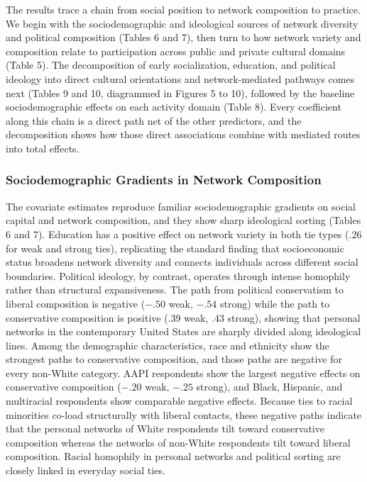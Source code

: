 \documentclass[
  12pt
]{article}
\begin{document}
The results trace a chain from social position to network composition to practice. We begin with the sociodemographic and ideological sources of network diversity and political composition (Tables 6 and 7), then turn to how network variety and composition relate to participation across public and private cultural domains (Table 5). The decomposition of early socialization, education, and political ideology into direct cultural orientations and network-mediated pathways comes next (Tables 9 and 10, diagrammed in Figures 5 to 10), followed by the baseline sociodemographic effects on each activity domain (Table 8). Every coefficient along this chain is a direct path net of the other predictors, and the decomposition shows how those direct associations combine with mediated routes into total effects.

\subsubsection{Sociodemographic Gradients in Network Composition}\label{sociodemographic-gradients-in-network-composition}

The covariate estimates reproduce familiar sociodemographic gradients on social capital and network composition, and they show sharp ideological sorting (Tables 6 and 7). Education has a positive effect on network variety in both tie types (.26 for weak and strong ties), replicating the standard finding that socioeconomic status broadens network diversity and connects individuals across different social boundaries. Political ideology, by contrast, operates through intense homophily rather than structural expansiveness. The path from political conservatism to liberal composition is negative ($-.50$ weak, $-.54$ strong) while the path to conservative composition is positive (.39 weak, .43 strong), showing that personal networks in the contemporary United States are sharply divided along ideological lines. Among the demographic characteristics, race and ethnicity show the strongest paths to conservative composition, and those paths are negative for every non-White category. AAPI respondents show the largest negative effects on conservative composition ($-.20$ weak, $-.25$ strong), and Black, Hispanic, and multiracial respondents show comparable negative effects. Because ties to racial minorities co-load structurally with liberal contacts, these negative paths indicate that the personal networks of White respondents tilt toward conservative composition whereas the networks of non-White respondents tilt toward liberal composition. Racial homophily in personal networks and political sorting are closely linked in everyday social ties.
\end{document}
